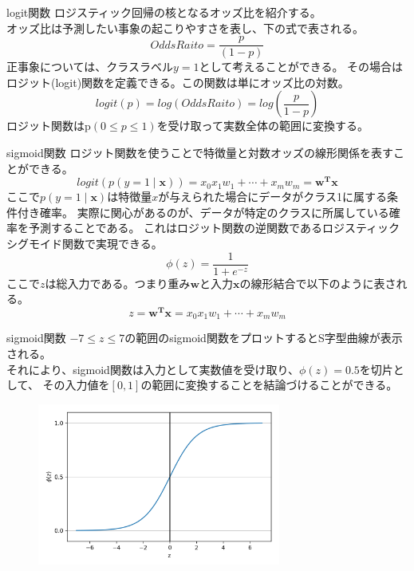 \documentclass[aspectratio=169, dvipdfmx, 11pt]{beamer} %
\begin{document}
\begin{frame}{logit関数}
    ロジスティック回帰の核となるオッズ比を紹介する。\\
    オッズ比は予測したい事象の起こりやすさを表し、下の式で表される。
    \begin{equation*}
        Odds Raito = \frac{p}{(1-p)}
    \end{equation*}
    正事象については、クラスラベル\(y=1\)として考えることができる。
    その場合はロジット(logit)関数を定義できる。この関数は単にオッズ比の対数。
    \begin{equation*}
        logit(p) = log(OddsRaito) = log(\frac{p}{1-p})
    \end{equation*}
    ロジット関数はp\((0\leq p \leq 1)\)を受け取って実数全体の範囲に変換する。
\end{frame} 

\begin{frame}{sigmoid関数}
    ロジット関数を使うことで特徴量と対数オッズの線形関係を表すことができる。
    \begin{equation*}
        logit(p(y=1 \mid \bm{x})) = x_0x_1w_1 + \cdots  + x_mw_m = \bm{w^T}\bm{x}
    \end{equation*}
    ここで\(p(y=1 \mid \bm{x})\)は特徴量\(x\)が与えられた場合にデータがクラス1に属する条件付き確率。
    実際に関心があるのが、データが特定のクラスに所属している確率を予測することである。
    これはロジット関数の逆関数であるロジスティックシグモイド関数で実現できる。
    \begin{equation*}
        \phi(z) = \frac{1}{1+e^{-z}}
    \end{equation*}
    ここで\(z\)は総入力である。つまり重み\(\bm{w}\)と入力\(\bm{x}\)の線形結合で以下のように表される。
    \begin{equation*}
        z = \bm{w^T}\bm{x} = x_0x_1w_1 + \cdots  + x_mw_m
    \end{equation*}
\end{frame}

\begin{frame}{sigmoid関数}
    \(-7 \leq z \leq  7\)の範囲のsigmoid関数をプロットするとS字型曲線が表示される。 \\
    それにより、sigmoid関数は入力として実数値を受け取り、\(\phi(z)=0.5\)を切片として、
    その入力値を\([0, 1]\)の範囲に変換することを結論づけることができる。
    \begin{figure}[b]
        \begin{center}
        \includegraphics[width=80mm]{img/day02/fig02.png}
        \end{center}
    \end{figure}
\end{frame}
\end{document}
